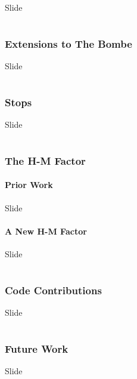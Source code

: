 \documentclass[hyphens,aspectratio=169]{beamer}
\begin{document}
\begin{frame}[fragile]{Slide}
\end{frame}

\part{}
\section{Extensions to The Bombe}

\begin{frame}[fragile]{Slide}
\end{frame}

\part{}
\section{Stops}

\begin{frame}[fragile]{Slide}
\end{frame}

\part{}
\section{The H-M Factor}

\subsection{Prior Work}

\begin{frame}[fragile]{Slide}
\end{frame}

\subsection{A New H-M Factor}

\begin{frame}[fragile]{Slide}
\end{frame}

\part{}
\section{Code Contributions}

\begin{frame}[fragile]{Slide}
\end{frame}

\part{}
\section{Future Work}

\begin{frame}[fragile]{Slide}
\end{frame}
\end{document}
